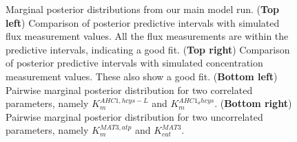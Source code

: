 \documentclass[journal=asbcd6,manuscript=article,layout=traditional]{achemso}
\begin{document}
\begin{figure}

\begin{minipage}[t]{\linewidth}

{\centering 


}

\end{minipage}%

\caption{\label{fig-posterior}Marginal posterior distributions from our
main model run. (\textbf{Top left}) Comparison of posterior predictive
intervals with simulated flux measurement values. All the flux
measurements are within the predictive intervals, indicating a good fit.
(\textbf{Top right}) Comparison of posterior predictive intervals with
simulated concentration measurement values. These also show a good fit.
(\textbf{Bottom left}) Pairwise marginal posterior distribution for two
correlated parameters, namely \(K_m^{AHC1,hcys-L}\) and
\(K_m^{AHC1_ahcys}\). (\textbf{Bottom right}) Pairwise marginal
posterior distribution for two uncorrelated parameters, namely
\(K_m^{MAT3,atp}\) and \(K_{cat}^{MAT3}\).}

\end{figure}
\end{document}
